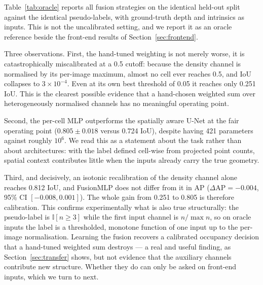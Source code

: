 \documentclass[sigconf]{acmart}
\newcommand{\rev}[1]{{\color{revcolor}#1}}
\newenvironment{revised}{\color{revcolor}}{}
\begin{document}
Table~\ref{tab:oracle} reports all fusion strategies on the identical held-out split against the identical pseudo-labels\rev{, with ground-truth depth and intrinsics as inputs. This is not the uncalibrated setting, and we report it as an oracle reference beside the front-end results of Section~\ref{sec:frontend}.}

\rev{Three} observations. First, the hand-tuned weighting is not merely worse, it is catastrophically miscalibrated at a 0.5 cutoff: because the density channel is normalised by its per-image maximum, almost no cell ever reaches 0.5, and IoU collapses to $3\times10^{-4}$. Even at its own best threshold of 0.05 it reaches only 0.251 IoU. This is the clearest possible evidence that a hand-chosen weighted sum over heterogeneously normalised channels has no meaningful operating point.

Second, the per-cell MLP outperforms the spatially aware U-Net at the fair operating point (\rev{$0.805\pm0.018$} versus \rev{0.724} IoU), despite having 421 parameters against roughly $10^6$. We read this as a statement about the task rather than about architectures: with the label defined cell-wise from projected point counts, spatial context contributes little \rev{when the inputs already carry the true geometry}.

\begin{revised}
Third, and decisively, an isotonic recalibration of the density channel alone reaches 0.812 IoU, and FusionMLP does not differ from it in AP ($\Delta\text{AP} = -0.004$, 95\% CI $[-0.008, 0.001]$). The whole gain from 0.251 to 0.805 is therefore calibration. This confirms experimentally what is also true structurally: the pseudo-label is $\mathbb{I}[n \geq 3]$ while the first input channel is $n/\max n$, so on oracle inputs the label is a thresholded, monotone function of one input up to the per-image normalisation. Learning the fusion recovers a calibrated occupancy decision that a hand-tuned weighted sum destroys --- a real and useful finding, as Section~\ref{sec:transfer} shows, but not evidence that the auxiliary channels contribute new structure. Whether they do can only be asked on front-end inputs, which we turn to next.
\end{revised}
\end{document}
